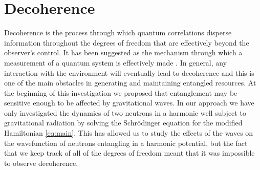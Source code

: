\section{Decoherence}\label{sec:decoherence}

Decoherence is the process through which quantum correlations disperse
information throughout the degrees of freedom that are effectively
beyond the observer's control. It has been suggested as the mechanism
through which a measurement of a quantum system is effectively made
\cite{zurek}. In general, any interaction with the environment will
eventually lead to decoherence and this is one of the main obstacles
in generating and maintaining entangled resources. At the beginning of
this investigation we proposed that entanglement may be sensitive
enough to be affected by gravitational waves. In our approach we have
only investigated the dynamics of two neutrons in a harmonic well
subject to gravitational radiation by solving the Schr\"{o}dinger
equation for the modified Hamiltonian \eqref{eq:main}. This has
allowed us to study the effects of the waves on the wavefunction of
neutrons entangling in a harmonic potential, but the fact that we keep
track of all of the degrees of freedom meant that it was impossible to
observe decoherence.

